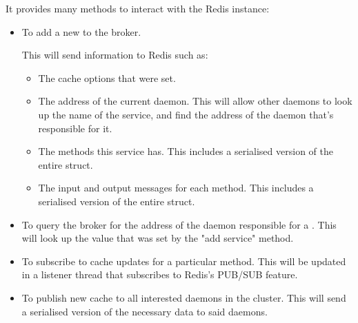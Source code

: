 \documentclass[a4paper,12pt]{report}
\begin{document}
It provides many methods to interact with the Redis instance:
\begin{itemize}
    \item To add a new \textit{} to the broker. 
    
    This will send information to Redis such as:
    
    \begin{itemize}
        \item The cache options that were set.
        \item The address of the current daemon. This will allow other daemons to look up the name of the service, and find the address of the daemon that's responsible for it.
        \item The methods this service has. This includes a serialised version of the entire  struct.
        \item The input and output messages for each method. This includes a serialised version of the entire  struct.
    \end{itemize}
    
    \item To query the broker for the address of the daemon responsible for a \textit{}.
    This will look up the value that was set by the "add service" method.
    
    \item To subscribe to cache updates for a particular method. This will be updated in a listener thread that subscribes to Redis's PUB/SUB feature.
    
    \item To publish new cache to all interested daemons in the cluster. This will send a serialised version of the necessary data to said daemons.
    

\end{itemize}
\end{document}
